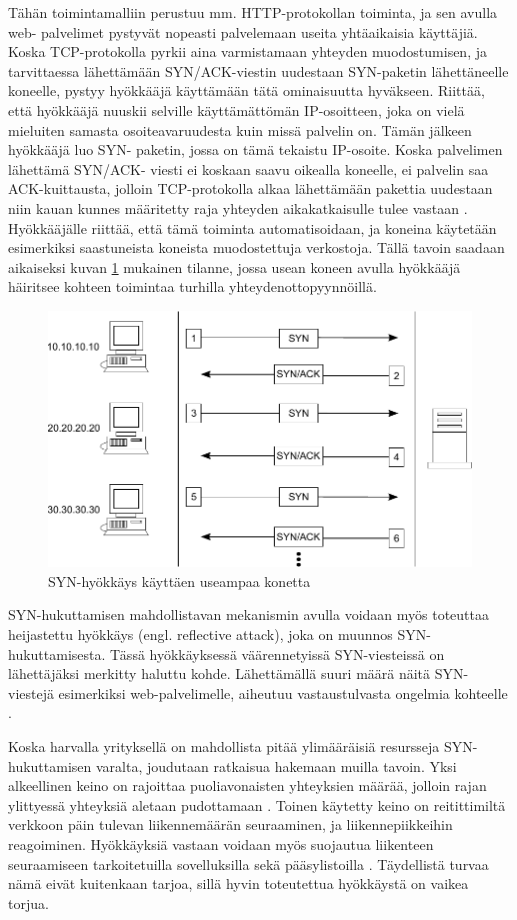 Tähän toimintamalliin perustuu mm. HTTP-protokollan toiminta, ja sen avulla web-
palvelimet pystyvät nopeasti palvelemaan useita yhtäaikaisia käyttäjiä.
Koska TCP-protokolla pyrkii aina varmistamaan yhteyden muodostumisen, ja tarvittaessa 
lähettämään SYN/ACK-viestin uudestaan SYN-paketin lähettäneelle koneelle, pystyy hyökkääjä
käyttämään tätä ominaisuutta hyväkseen. Riittää, että hyökkääjä nuuskii
selville käyttämättömän IP-osoitteen, joka on vielä mieluiten samasta
osoiteavaruudesta kuin missä palvelin on. Tämän jälkeen hyökkääjä luo SYN-
paketin, jossa on tämä tekaistu IP-osoite. Koska palvelimen lähettämä SYN/ACK-
viesti ei koskaan saavu oikealla koneelle, ei palvelin saa ACK-kuittausta,
jolloin TCP-protokolla alkaa lähettämään pakettia uudestaan niin kauan kunnes
määritetty raja yhteyden aikakatkaisulle tulee vastaan \cite{STACK}. Hyökkääjälle
riittää, että tämä toiminta automatisoidaan, ja koneina käytetään esimerkiksi
saastuneista koneista muodostettuja verkostoja. Tällä tavoin saadaan aikaiseksi
kuvan \ref{syn} mukainen tilanne, jossa usean koneen avulla hyökkääjä häiritsee
kohteen toimintaa turhilla yhteydenottopyynnöillä.

\begin{figure}[hpt]
\centering
\includegraphics[width=12cm]{pics/synflood.pdf}
\caption{SYN-hyökkäys käyttäen useampaa konetta}
\label{syn}
\end{figure}

SYN-hukuttamisen mahdollistavan mekanismin avulla voidaan myös toteuttaa
heijastettu hyökkäys (engl. reflective attack), joka on muunnos SYN-
hukuttamisesta. Tässä hyökkäyksessä väärennetyissä SYN-viesteissä on
lähettäjäksi merkitty haluttu kohde. Lähettämällä suuri määrä näitä SYN-
viestejä esimerkiksi web-palvelimelle, aiheutuu vastaustulvasta ongelmia
kohteelle \cite{STACK}.

Koska harvalla yrityksellä on mahdollista pitää ylimääräisiä resursseja SYN-
hukuttamisen varalta, joudutaan ratkaisua hakemaan muilla tavoin. Yksi
alkeellinen keino on rajoittaa puoliavonaisten yhteyksien määrää, jolloin rajan
ylittyessä yhteyksiä aletaan pudottamaan \cite{TCP}. Toinen käytetty keino on
reitittimiltä verkkoon päin tulevan liikennemäärän seuraaminen, ja
liikennepiikkeihin reagoiminen. Hyökkäyksiä vastaan voidaan myös suojautua
liikenteen seuraamiseen tarkoitetuilla sovelluksilla sekä pääsylistoilla \cite{STACK}.
Täydellistä turvaa nämä eivät kuitenkaan tarjoa, sillä hyvin toteutettua
hyökkäystä on vaikea torjua.

